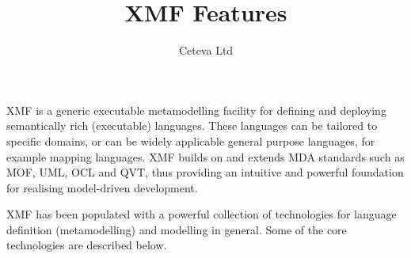\documentclass{article}
\title{XMF Features}
\author{Ceteva Ltd}
\begin{document}
\maketitle

XMF is a generic executable metamodelling facility for defining and deploying
semantically rich (executable) languages. These languages can be tailored to
specific domains, or can be widely applicable general purpose languages, for 
example mapping languages. XMF builds on and extends MDA standards such as 
MOF, UML, OCL and QVT, thus providing an intuitive and powerful foundation for
realising model-driven development.

XMF has been populated with a powerful collection of technologies for
language definition (metamodelling) and modelling in general. Some of the
core technologies are described below.
\end{document}
